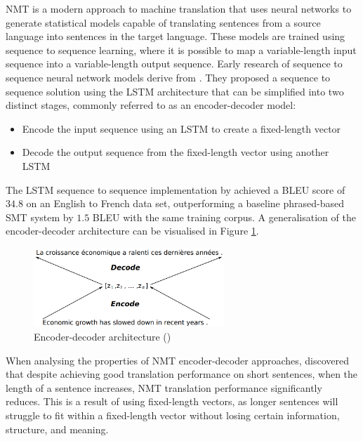 \acrfull{NMT} is a modern approach to machine translation that uses neural networks to generate statistical models capable of translating sentences from a source language into sentences in the target language.
These models are trained using sequence to sequence learning, where it is possible to map a variable-length input sequence into a variable-length output sequence. %
Early research of sequence to sequence neural network models derive from \cite{sutskever_sequence_2014}. They proposed a sequence to sequence solution using the \acrshort{LSTM} architecture that can be simplified into two distinct stages, commonly referred to as an encoder-decoder model:
\begin{itemize}
    \item Encode the input sequence using an \acrshort{LSTM} to create a fixed-length vector
    \item Decode the output sequence from the fixed-length vector using another \acrshort{LSTM}
\end{itemize}

The \acrshort{LSTM} sequence to sequence implementation by \cite{sutskever_sequence_2014} achieved a \acrshort{BLEU} score of $34.8$ on an English to French data set, outperforming a baseline phrased-based \acrshort{SMT} system by $1.5$ \acrshort{BLEU} with the same training corpus.
A generalisation of the encoder-decoder architecture can be visualised in Figure \ref{fig:encoder_decoder}.
\begin{figure}[ht!]
\centering
\includegraphics[width=0.64\textwidth]{media/literature/machine_translation/mt_encoder-decoder.png}
\caption[Encoder-decoder architecture]{Encoder-decoder architecture (\cite{cho_properties_2014})}
\label{fig:encoder_decoder}
\end{figure}


When analysing the properties of \acrshort{NMT} encoder-decoder approaches, \cite{cho_properties_2014} discovered that despite achieving good translation performance on short sentences, when the length of a sentence increases, \acrshort{NMT} translation performance significantly reduces. This is a result of using fixed-length vectors, as longer sentences will struggle to fit within a fixed-length vector without losing certain information, structure, and meaning.

